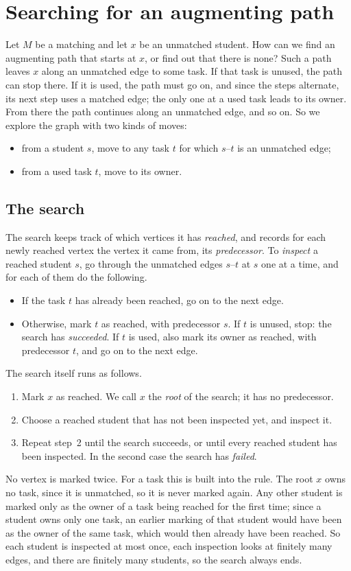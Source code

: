 \section{Searching for an augmenting path}\label{ch08:sec:search}
Let $M$ be a matching and let $x$ be an unmatched student. How can we find an augmenting path that starts at $x$, or find out that there is none? Such a path leaves $x$ along an unmatched edge to some task. If that task is unused, the path can stop there. If it is used, the path must go on, and since the steps alternate, its next step uses a matched edge; the only one at a used task leads to its owner. From there the path continues along an unmatched edge, and so on. So we explore the graph with two kinds of moves:
\begin{itemize}
\item from a student $s$, move to any task $t$ for which $s$--$t$ is an unmatched edge;
\item from a used task $t$, move to its owner.
\end{itemize}

\subsection*{The search}
The search keeps track of which vertices it has \emph{reached}, and records for each newly reached vertex the vertex it came from, its \emph{predecessor}. To \emph{inspect} a reached student $s$, go through the unmatched edges $s$--$t$ at $s$ one at a time, and for each of them do the following.
\begin{itemize}
\item If the task $t$ has already been reached, go on to the next edge.
\item Otherwise, mark $t$ as reached, with predecessor $s$. If $t$ is unused, stop: the search has \emph{succeeded}. If $t$ is used, also mark its owner as reached, with predecessor $t$, and go on to the next edge.
\end{itemize}
The search itself runs as follows.
\begin{enumerate}
\item Mark $x$ as reached. We call $x$ the \emph{root} of the search; it has no predecessor.
\item Choose a reached student that has not been inspected yet, and inspect it.
\item Repeat step~2 until the search succeeds, or until every reached student has been inspected. In the second case the search has \emph{failed}.
\end{enumerate}
No vertex is marked twice. For a task this is built into the rule. The root $x$ owns no task, since it is unmatched, so it is never marked again. Any other student is marked only as the owner of a task being reached for the first time; since a student owns only one task, an earlier marking of that student would have been as the owner of the same task, which would then already have been reached. So each student is inspected at most once, each inspection looks at finitely many edges, and there are finitely many students, so the search always ends.


